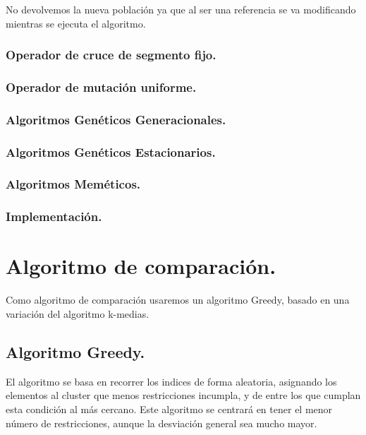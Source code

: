 \documentclass[12pt, spanish]{article}
\begin{document}
No devolvemos la nueva población ya que al ser una referencia se va modificando mientras se ejecuta el algoritmo.

\subsubsection{Operador de cruce de segmento fijo.}

\subsubsection{Operador de mutación uniforme.}

\subsubsection{Algoritmos Genéticos Generacionales.}

\subsubsection{Algoritmos Genéticos Estacionarios.}

\subsubsection{Algoritmos Meméticos.}

\subsubsection{Implementación.}

\section{Algoritmo de comparación.}

Como algoritmo de comparación usaremos un algoritmo Greedy, basado en una variación del algoritmo k-medias.

\subsection{Algoritmo Greedy.}

El algoritmo se basa en recorrer los indices de forma aleatoria, asignando los elementos al cluster que menos restricciones incumpla, y de entre los que cumplan esta condición al más cercano. Este algoritmo se centrará en tener el menor número de restricciones, aunque la desviación general sea mucho mayor.
\end{document}
